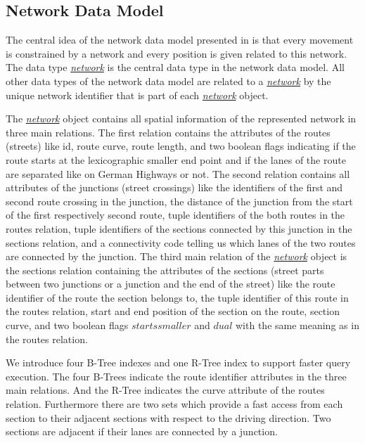 \documentclass[a4paper]{article}
\newcommand{\dt}[1]{\textsl{\underline{#1}}}
\begin{document}
\subsection{Network Data Model}
\label{sec:netdatamod}
The central idea of the network data model presented in \cite{1146465} is that
every movement is constrained by a network and every position is given related
to this network. The data type \dt{network} is the central data type in the network
data model. All other data types of the network data model are related to a
\dt{network} by the unique network identifier that is part of each \dt{network}
object.

The \dt{network} object contains all spatial information of the represented network
in three main relations. The first relation contains the attributes of the routes
(streets) like id, route curve, route length, and two boolean flags indicating
if the route starts at the lexicographic smaller end point and if the lanes of
the route are separated like on German Highways or not. The second relation
contains all attributes of the junctions (street crossings) like the identifiers
of the first and second route crossing in the junction, the distance of the
junction from the start of the first respectively second route, tuple identifiers
 of the both routes in the routes relation, tuple identifiers of the sections
connected by this junction in the sections relation, and a connectivity code
telling us which lanes of the two routes are connected by the junction. The third
main relation of the \dt{network} object is the sections relation containing the
attributes of the sections (street parts between two junctions or a junction and
the end of the street) like the route identifier of the route the section belongs to,
 the tuple identifier of this route in the routes relation, start and end position
 of the section on the route, section curve, and two boolean flags $startssmaller$
and $dual$ with the same meaning as in the routes relation.

We introduce four B-Tree indexes and one R-Tree index to support faster query execution.
 The four B-Trees indicate the route identifier attributes in the three main relations.
 And the R-Tree indicates the curve attribute of the routes relation. Furthermore
there are two sets which provide a fast access from each section to their adjacent
sections with respect to the driving direction. Two sections are adjacent if their
lanes are connected by a junction.
\end{document}
